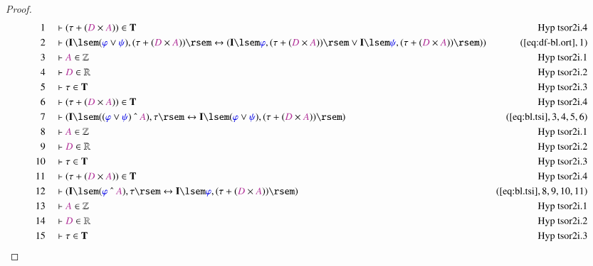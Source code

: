 \begin{proof}
\begin{align}
  1 &&  & \vdash ( \tau + ( \mc{D} \times \mc{A} ) ) \in
      \mathbf{T}&\text{Hyp~tsor2i.4}\notag%
  \\ 2 &&  & \vdash ( \mathbf{I} \lsem ( \mw{\varphi} \vee \mw{\psi} ) , ( \tau
      + ( \mc{D} \times \mc{A} ) ) \rsem \leftrightarrow (
      \mathbf{I} \lsem \mw{\varphi} , ( \tau + ( \mc{D}
      \times \mc{A} ) ) \rsem \vee \mathbf{I} \lsem
      \mw{\psi} , ( \tau + ( \mc{D} \times \mc{A} ) ) \rsem
      ) )&(\mbox{\ref{eq:df-bl.ort}},1)\notag
  \\ 3 &&  & \vdash \mc{A} \in \mathbb{Z}&\text{Hyp~tsor2i.1}\notag%
  \\ 4 &&  & \vdash \mc{D} \in \mathbb{R}&\text{Hyp~tsor2i.2}\notag%
  \\ 5 &&  & \vdash \tau \in \mathbf{T}&\text{Hyp~tsor2i.3}\notag%
  \\ 6 &&  & \vdash ( \tau + ( \mc{D} \times \mc{A} ) ) \in
      \mathbf{T}&\text{Hyp~tsor2i.4}\notag%
  \\ 7 &&  & \vdash ( \mathbf{I} \lsem ( ( \mw{\varphi} \vee \mw{\psi} )
      ~\string^~ \mc{A} ) , \tau \rsem \leftrightarrow
      \mathbf{I} \lsem ( \mw{\varphi} \vee \mw{\psi} ) , (
      \tau + ( \mc{D} \times \mc{A} ) ) \rsem
      )&(\mbox{\ref{eq:bl.tsi}},3,4,5,6)\notag
  \\ 8 &&  & \vdash \mc{A} \in \mathbb{Z}&\text{Hyp~tsor2i.1}\notag%
  \\ 9 &&  & \vdash \mc{D} \in \mathbb{R}&\text{Hyp~tsor2i.2}\notag%
  \\ 10 &&  & \vdash \tau \in \mathbf{T}&\text{Hyp~tsor2i.3}\notag%
  \\ 11 &&  & \vdash ( \tau + ( \mc{D} \times \mc{A} ) ) \in
      \mathbf{T}&\text{Hyp~tsor2i.4}\notag%
  \\ 12 &&  & \vdash ( \mathbf{I} \lsem ( \mw{\varphi} ~\string^~ \mc{A} ) ,
      \tau \rsem \leftrightarrow \mathbf{I} \lsem
      \mw{\varphi} , ( \tau + ( \mc{D} \times \mc{A} ) )
      \rsem )&(\mbox{\ref{eq:bl.tsi}},8,9,10,11)\notag
  \\ 13 &&  & \vdash \mc{A} \in
      \mathbb{Z}&\text{Hyp~tsor2i.1}\notag%
  \\ 14 &&  & \vdash \mc{D} \in
      \mathbb{R}&\text{Hyp~tsor2i.2}\notag%
  \\ 15 &&  & \vdash \tau \in \mathbf{T}&\text{Hyp~tsor2i.3}\notag%

\end{align}
\end{proof}
